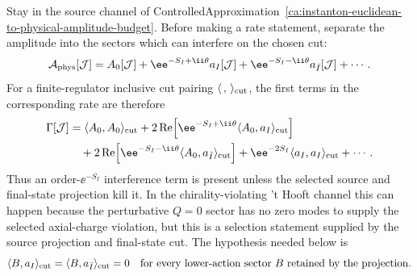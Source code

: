 \begin{controlledapproximation}
\label{ca:instanton-unitarity-cut-pairing}
Stay in the source channel of
ControlledApproximation~\ref{ca:instanton-euclidean-to-physical-amplitude-budget}.
Before making a rate statement, separate the amplitude into the sectors which
can interfere on the chosen cut:
\begin{equation}
  \mathcal A_{\rm phys}[\mathcal J]
  =
  A_0[\mathcal J]
  +
  \ee^{-S_I+\ii\theta}a_I[\mathcal J]
  +
  \ee^{-S_I-\ii\theta}a_{\bar I}[\mathcal J]
  +
  \cdots .
  \label{eq:instanton-amplitude-sector-expansion}
\end{equation}
For a finite-regulator inclusive cut pairing \(\langle\,,\,\rangle_{\rm cut}\),
the first terms in the corresponding rate are therefore
\begin{equation}
\begin{aligned}
  \Gamma[\mathcal J]
  &=
  \langle A_0,A_0\rangle_{\rm cut}
  +
  2\operatorname{Re}\!
  \left[
    \ee^{-S_I+\ii\theta}
    \langle A_0,a_I\rangle_{\rm cut}
  \right] \\
  &\quad
  +
  2\operatorname{Re}\!
  \left[
    \ee^{-S_I-\ii\theta}
    \langle A_0,a_{\bar I}\rangle_{\rm cut}
  \right]
  +
  \ee^{-2S_I}
  \langle a_I,a_I\rangle_{\rm cut}
  +
  \cdots .
\end{aligned}
  \label{eq:instanton-inclusive-rate-sector-expansion}
\end{equation}
Thus an order-\(\ee^{-S_I}\) interference term is present unless the selected
source and final-state projection kill it.  In the chirality-violating
't Hooft channel this can happen because the perturbative \(Q=0\) sector has no
zero modes to supply the selected axial-charge violation, but this is a
selection statement supplied by the source projection and final-state cut.
The hypothesis needed below is
\begin{equation}
  \langle B,a_I\rangle_{\rm cut}
  =
  \langle B,a_{\bar I}\rangle_{\rm cut}
  =
  0
  \quad
  \text{for every lower-action sector }B\text{ retained by the projection}.
  \label{eq:instanton-cut-selection-hypothesis}
\end{equation}


\end{controlledapproximation}
